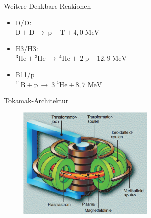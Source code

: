\documentclass[aspectratio=169,xcolor=dvipsnames,14pt]{beamer}
\begin{document}
    \begin{frame}{Weitere Denkbare Reakionen}
        \begin{itemize}
            \color{LightGrey}
            \item D/D: \\
                    \begin{math}
                        {\displaystyle \mathrm {D} +\mathrm {D} \ \to \ \mathrm {p} +\mathrm {T} +4{,}0\;\mathrm {MeV} }
                    \end{math}
    
            \item H3/H3: \\
            \begin{math}
                {\displaystyle \mathrm {^{3}He+\!^{3}He\ \rightarrow \ ^{4}He+\ 2\ p+12{,}9\;MeV} }
            \end{math}

            \item B11/p \\
            \begin{math}
                {\displaystyle \mathrm {^{11}B+\!p\ \rightarrow \ 3\;^{4}He+8{,}7\;MeV} }
            \end{math}
            
        \end{itemize}
    \end{frame}

    \begin{frame}{Tokamak-Architektur}
        \begin{figure}
            \centering
            \includegraphics[width=0.6\textwidth]{Images/Tokamak.png}
        \end{figure}    
    \end{frame}
\end{document}
